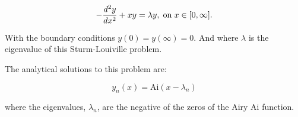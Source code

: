 \documentclass[12pt,a4paper,openright]{article}
\begin{document}
	\[
	- \dfrac{d^2 y}{dx^2} + xy = \lambda y, \hspace{0.1cm}\mathrm{on} \hspace{0.1cm} x\in[0,\infty].
	\]
	
	With the boundary conditions $y(0)=y(\infty)=0$. And where $\lambda$ is the eigenvalue of this Sturm-Louiville problem. 
	
	The analytical solutions to this problem are:
	
	\[
	y_n(x) = \mathrm{Ai}(x-\lambda_n)
	\]
	
	where the eigenvalues, $\lambda_n$, are the negative of the zeros of the Airy Ai function.
\end{document}
